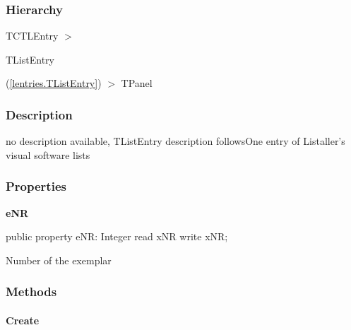 \documentclass{report}
\newif\ifpdf
\begin{document}
\subsubsection*{\large{\textbf{Hierarchy}}\normalsize\hspace{1ex}\hfill}
TCTLEntry {$>$} \begin{ttfamily}TListEntry\end{ttfamily}(\ref{lentries.TListEntry}) {$>$} 
TPanel
\subsubsection*{\large{\textbf{Description}}\normalsize\hspace{1ex}\hfill}
no description available, TListEntry description followsOne entry of Listaller's visual software lists\subsubsection*{\large{\textbf{Properties}}\normalsize\hspace{1ex}\hfill}
\begin{list}{}{
\setlength{\itemindent}{0cm}
\setlength{\listparindent}{0cm}
\setlength{\leftmargin}{\evensidemargin}
\addtolength{\leftmargin}{\tmplength}
\settowidth{\labelsep}{X}
\addtolength{\leftmargin}{\labelsep}
\setlength{\labelwidth}{\tmplength}
}
\label{swcatalog.TCTLEntry-eNR}
\item[\textbf{eNR}\hfill]
\ifpdf
\begin{flushleft}
\fi
\begin{ttfamily}
public property eNR: Integer read xNR write xNR;\end{ttfamily}

\ifpdf
\end{flushleft}
\fi


\par Number of the exemplar\end{list}
\subsubsection*{\large{\textbf{Methods}}\normalsize\hspace{1ex}\hfill}
\paragraph*{Create}\hspace*{\fill}
\end{document}
